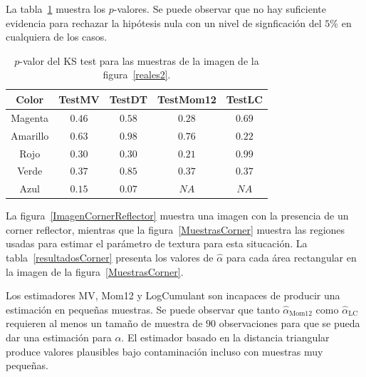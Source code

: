 La tabla~\ref{resultadosTestMunich} muestra los $p$-valores. Se puede observar que no hay suficiente evidencia para rechazar la hipótesis nula con un nivel de signficación del $5$\% en cualquiera de los casos.

\begin{table}[h!]
	\centering
	\begin{tabular}{c*4{c}}
		\toprule
		Color      & TestMV    & TestDT    & TestMom12  &TestLC \\
		\midrule
		Magenta    & $0.46$    & $ 0.58$   & $0.28$   & $0.69$\\
		Amarillo   & $0.63$    & $0.98$    & $0.76$   & $0.22$\\
		Rojo       & $0.30$    & $ 0.30$   & $0.21$   & $0.99$\\
		Verde      & $0.37$    & $0.85$    & $0.37$   & $0.37$\\
		Azul       & $0.15$    & $0.07$    & $NA $    & $NA $\\
		\bottomrule
	\end{tabular}
\caption{\label{resultadosTestMunich} $p$-valor del KS test para las muestras de la imagen de la figura~\ref{reales2}.}
\end{table}

La figura~\ref{ImagenCornerReflector} muestra una imagen con la presencia de un corner reflector, mientras que la figura~\ref{MuestrasCorner} muestra las regiones usadas para estimar el parámetro de textura para esta situcación. La tabla~\ref{resultadosCorner} presenta los valores de  $\widehat{\alpha}$ para cada área rectangular en la imagen de la figura~\ref{MuestrasCorner}.

Los estimadores MV, Mom12 y LogCumulant son incapaces de producir una estimación en pequeñas muestras.  Se puede observar que tanto $\widehat\alpha_{\text{Mom12}}$ como $\widehat\alpha_{\text{LC}}$ requieren al menos un tamaño de muestra de $90$ observaciones para que se pueda dar una estimación para $\alpha$. El estimador basado en la distancia triangular produce valores plausibles bajo contaminación incluso con muestras muy pequeñas.

